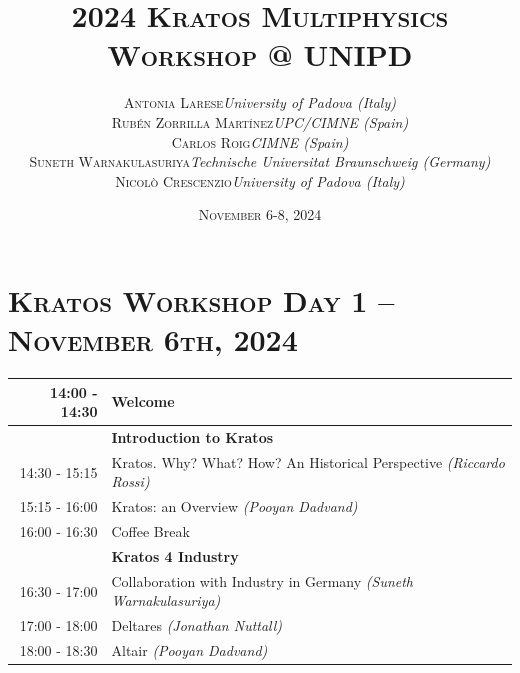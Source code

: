 \documentclass{article}
\begin{document}
\title{
   \Huge
   2024 \textsc{Kratos Multiphysics\\Workshop @ UNIPD}
}
\author{
   \small
   \begin{tabular}{rl}
      \textsc{Antonia Larese} & \textit{University of Padova (Italy)} \\
      \textsc{Rubén Zorrilla Martínez} & \textit{UPC/CIMNE (Spain)} \\
      \textsc{Carlos Roig} & \textit{CIMNE (Spain)} \\
      \textsc{Suneth Warnakulasuriya} & \textit{Technische Universitat Braunschweig (Germany)} \\
      \textsc{Nicol\`o Crescenzio} & \textit{University of Padova (Italy)}
   \end{tabular}
}
\date{\textsc{November} 6-8, 2024}
\maketitle

\renewcommand{\arraystretch}{1.5}

\section*{\centering\textsc{Kratos Workshop Day 1 -- November 6th, 2024}}

\begin{table}[h]\centering
   \begin{tabularx}{0.85\textwidth}{r|X}
      \toprule%
      \rowcolor{SeaGreen3!5!} 14:00 - 14:30 & Welcome \\%
      \midrule%
                    & {\large \textbf{Introduction to Kratos}} \\%
      14:30 - 15:15 & Kratos. Why? What? How? An Historical Perspective \textit{(Riccardo Rossi)}\\%
      15:15 - 16:00 & Kratos: an Overview \textit{(Pooyan Dadvand)}\\%
      \midrule%
      \rowcolor{SeaGreen3!5!} 16:00 - 16:30 & Coffee Break \\%
      \midrule%
                    & {\large \textbf{Kratos 4 Industry}} \\%
      16:30 - 17:00 & Collaboration with Industry in Germany \textit{(Suneth Warnakulasuriya)}\\%
      17:00 - 18:00 & Deltares \textit{(Jonathan Nuttall)}\\%
      18:00 - 18:30 & Altair \textit{(Pooyan Dadvand)}\\%
      \bottomrule
   \end{tabularx}
\end{table}
\end{document}
